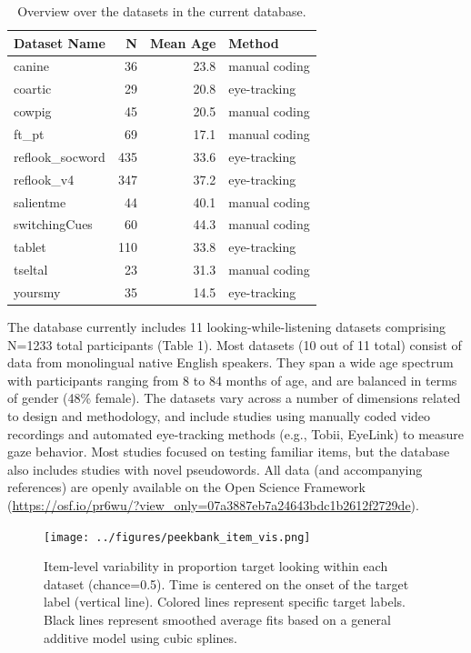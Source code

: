 \documentclass[10pt, letterpaper]{article}
\begin{document}
\begin{table}[H]
\centering
\begingroup\fontsize{9pt}{10pt}\selectfont
\begin{tabular}{lrrl}
  \hline
Dataset Name & N & Mean Age & Method \\ 
  \hline
canine & 36 & 23.8 & manual coding \\ 
  coartic & 29 & 20.8 & eye-tracking \\ 
  cowpig & 45 & 20.5 & manual coding \\ 
  ft\_pt & 69 & 17.1 & manual coding \\ 
  reflook\_socword & 435 & 33.6 & eye-tracking \\ 
  reflook\_v4 & 347 & 37.2 & eye-tracking \\ 
  salientme & 44 & 40.1 & manual coding \\ 
  switchingCues & 60 & 44.3 & manual coding \\ 
  tablet & 110 & 33.8 & eye-tracking \\ 
  tseltal & 23 & 31.3 & manual coding \\ 
  yoursmy & 35 & 14.5 & eye-tracking \\ 
   \hline
\end{tabular}
\endgroup
\caption{Overview over the datasets in the current database.} 
\end{table}

The database currently includes 11 looking-while-listening datasets
comprising N=1233 total participants (Table 1). Most datasets (10 out of
11 total) consist of data from monolingual native English speakers. They
span a wide age spectrum with participants ranging from 8 to 84 months
of age, and are balanced in terms of gender (48\% female). The datasets
vary across a number of dimensions related to design and methodology,
and include studies using manually coded video recordings and automated
eye-tracking methods (e.g., Tobii, EyeLink) to measure gaze behavior.
Most studies focused on testing familiar items, but the database also
includes studies with novel pseudowords. All data (and accompanying
references) are openly available on the Open Science Framework
(\url{https://osf.io/pr6wu/?view_only=07a3887eb7a24643bdc1b2612f2729de}).

\begin{figure} 
\texttt{[image: ../figures/peekbank\_item\_vis.png]}
\caption{Item-level variability in proportion target looking within each dataset (chance=0.5). Time is centered on the onset of the target label (vertical line). Colored lines represent specific target labels. Black lines represent smoothed average fits based on a general additive model using cubic splines.}
\label{fig:peekbank_item_vis}
\end{figure}
\end{document}
